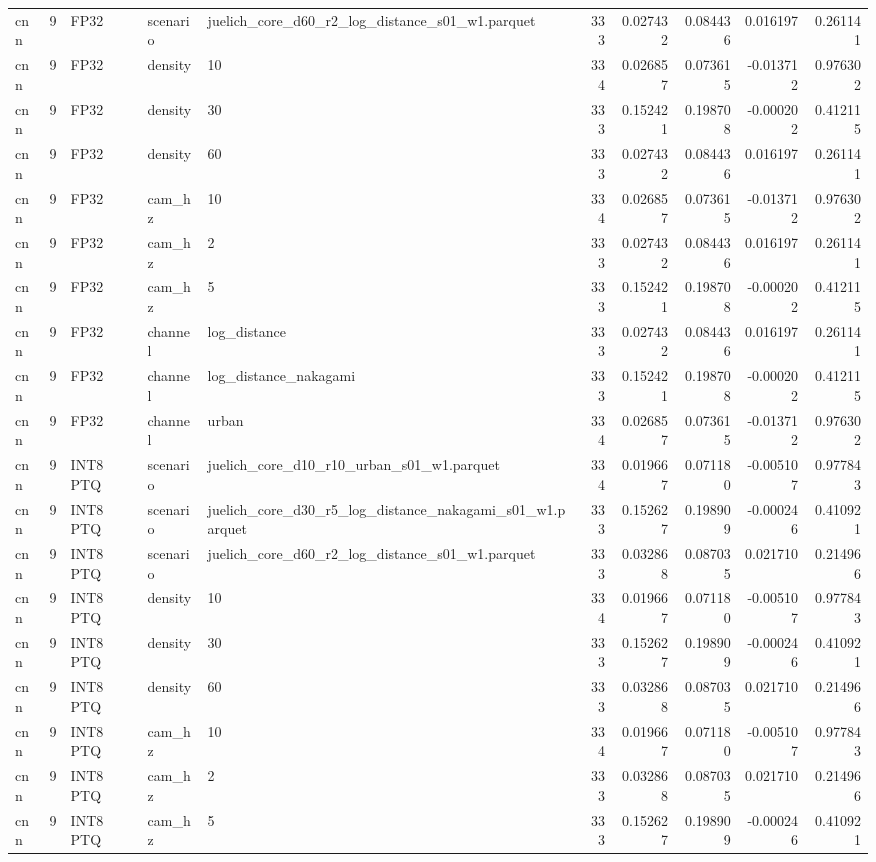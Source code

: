 \begin{tabular}{lrlllrrrrr}
cnn & 9 & FP32 & scenario & juelich\_core\_d60\_r2\_log\_distance\_s01\_w1.parquet & 333 & 0.027432 & 0.084436 & 0.016197 & 0.261141 \\
cnn & 9 & FP32 & density & 10 & 334 & 0.026857 & 0.073615 & -0.013712 & 0.976302 \\
cnn & 9 & FP32 & density & 30 & 333 & 0.152421 & 0.198708 & -0.000202 & 0.412115 \\
cnn & 9 & FP32 & density & 60 & 333 & 0.027432 & 0.084436 & 0.016197 & 0.261141 \\
cnn & 9 & FP32 & cam\_hz & 10 & 334 & 0.026857 & 0.073615 & -0.013712 & 0.976302 \\
cnn & 9 & FP32 & cam\_hz & 2 & 333 & 0.027432 & 0.084436 & 0.016197 & 0.261141 \\
cnn & 9 & FP32 & cam\_hz & 5 & 333 & 0.152421 & 0.198708 & -0.000202 & 0.412115 \\
cnn & 9 & FP32 & channel & log\_distance & 333 & 0.027432 & 0.084436 & 0.016197 & 0.261141 \\
cnn & 9 & FP32 & channel & log\_distance\_nakagami & 333 & 0.152421 & 0.198708 & -0.000202 & 0.412115 \\
cnn & 9 & FP32 & channel & urban & 334 & 0.026857 & 0.073615 & -0.013712 & 0.976302 \\
cnn & 9 & INT8 PTQ & scenario & juelich\_core\_d10\_r10\_urban\_s01\_w1.parquet & 334 & 0.019667 & 0.071180 & -0.005107 & 0.977843 \\
cnn & 9 & INT8 PTQ & scenario & juelich\_core\_d30\_r5\_log\_distance\_nakagami\_s01\_w1.parquet & 333 & 0.152627 & 0.198909 & -0.000246 & 0.410921 \\
cnn & 9 & INT8 PTQ & scenario & juelich\_core\_d60\_r2\_log\_distance\_s01\_w1.parquet & 333 & 0.032868 & 0.087035 & 0.021710 & 0.214966 \\
cnn & 9 & INT8 PTQ & density & 10 & 334 & 0.019667 & 0.071180 & -0.005107 & 0.977843 \\
cnn & 9 & INT8 PTQ & density & 30 & 333 & 0.152627 & 0.198909 & -0.000246 & 0.410921 \\
cnn & 9 & INT8 PTQ & density & 60 & 333 & 0.032868 & 0.087035 & 0.021710 & 0.214966 \\
cnn & 9 & INT8 PTQ & cam\_hz & 10 & 334 & 0.019667 & 0.071180 & -0.005107 & 0.977843 \\
cnn & 9 & INT8 PTQ & cam\_hz & 2 & 333 & 0.032868 & 0.087035 & 0.021710 & 0.214966 \\
cnn & 9 & INT8 PTQ & cam\_hz & 5 & 333 & 0.152627 & 0.198909 & -0.000246 & 0.410921 \\

\end{tabular}
